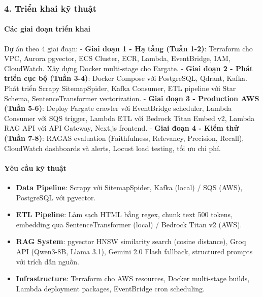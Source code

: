 \hypertarget{triux1ec3n-khai-kux1ef9-thuux1eadt}{%
\subsubsection{4. Triển khai kỹ
thuật}}

\hypertarget{cuxe1c-giai-ux111oux1ea1n-triux1ec3n-khai}{%
\paragraph{Các giai đoạn triển
khai}}

Dự án theo 4 giai đoạn: - \textbf{Giai đoạn 1 - Hạ tầng (Tuần 1-2)}:
Terraform cho VPC, Aurora pgvector, ECS Cluster, ECR, Lambda,
EventBridge, IAM, CloudWatch. Xây dựng Docker multi-stage cho Fargate. -
\textbf{Giai đoạn 2 - Phát triển cục bộ (Tuần 3-4)}: Docker Compose với
PostgreSQL, Qdrant, Kafka. Phát triển Scrapy SitemapSpider, Kafka
Consumer, ETL pipeline với Star Schema, SentenceTransformer
vectorization. - \textbf{Giai đoạn 3 - Production AWS (Tuần 5-6)}:
Deploy Fargate crawler với EventBridge scheduler, Lambda Consumer với
SQS trigger, Lambda ETL với Bedrock Titan Embed v2, Lambda RAG API với
API Gateway, Next.js frontend. - \textbf{Giai đoạn 4 - Kiểm thử (Tuần
7-8)}: RAGAS evaluation (Faithfulness, Relevancy, Precision, Recall),
CloudWatch dashboards và alerts, Locust load testing, tối ưu chi phí.

\hypertarget{yuxeau-cux1ea7u-kux1ef9-thuux1eadt}{%
\paragraph{Yêu cầu kỹ thuật}}

\begin{itemize}
\tightlist
\item
  \textbf{Data Pipeline}: Scrapy với SitemapSpider, Kafka (local) / SQS
  (AWS), PostgreSQL với pgvector.
\item
  \textbf{ETL Pipeline}: Làm sạch HTML bằng regex, chunk text 500
  tokens, embedding qua SentenceTransformer (local) / Bedrock Titan v2
  (AWS).
\item
  \textbf{RAG System}: pgvector HNSW similarity search (cosine
  distance), Groq API (Qwen3-8B, Llama 3.1), Gemini 2.0 Flash fallback,
  structured prompts với trích dẫn nguồn.
\item
  \textbf{Infrastructure}: Terraform cho AWS resources, Docker
  multi-stage builds, Lambda deployment packages, EventBridge cron
  scheduling.
\end{itemize}

